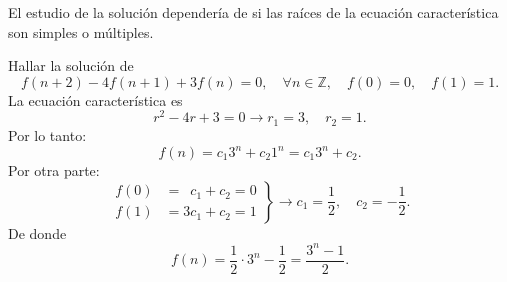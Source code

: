 El estudio de la solución dependería de si las raíces de la ecuación característica son simples o múltiples.
\begin{example}
	Hallar la solución de \[ f(n+2)-4f(n+1)+3f(n)=0,\quad\forall n\in\mathds{Z},\quad f(0)=0,\quad f(1)=1. \] La ecuación característica es \[ r^{2}-4r+3=0\rightarrow r_{1}=3,\quad r_{2}=1. \] Por lo tanto: \[ f(n)=c_{1}3^{n}+c_{2}1^{n}=c_{1}3^{n}+c_{2}. \] Por otra parte:
	\begin{equation*}
	\left.\begin{aligned}
	f(0)&=\phantom{1}c_{1}+c_{2}=0\\
	f(1)&=3c_{1}+c_{2}=1
	\end{aligned}
	\right\}
	\longrightarrow c_{1}=\frac{1}{2},\quad c_{2}=-\frac{1}{2}.
	\end{equation*}
De donde \[ f(n)=\frac{1}{2}\cdot3^{n}-\frac{1}{2}=\frac{3^{n}-1}{2}. \]
\end{example}